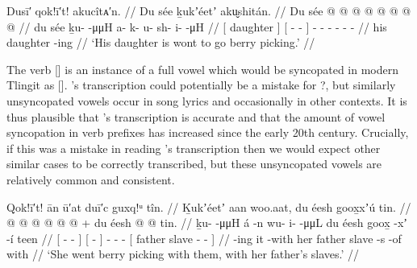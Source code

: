 \ex\label{ex:89-2-daughter-berry-picking}%
%
\begingl
	\glpreamble	Dusī′ qok!ī′t! akucîtᴀ′n. //
	\glpreamble	Du sée ḵukʼéetʼ aku̬shitán. //
	\gla	{} Du sée {}
		{}  @ {} @ {} {} {}
		 @ {} @ {} @ {} @ {} @ {} @ {} //
	\glb	{} du sée {} 
		{} ḵu-  -μμH {} {}
		a- k- u- sh- i-  -μH //
	\glc	{}[  daughter {}]
		{}[ -  - \· {}]
		- - - - -  - //
	\gld	{} his daughter {}
		{}  {} {} -ing {}
		 {} {} {} {} {} {} //
	\glft	‘His daughter is wont to go berry picking.’
		//
\endgl
\xe

The verb  [] is an instance of a full vowel which would be syncopated in modern Tlingit as  [].
\citeauthor{swanton:1909}’s transcription  could potentially be a mistake for ?, but similarly unsyncopated vowels occur in song lyrics and occasionally in other contexts.
It is thus plausible that \citeauthor{swanton:1909}’s transcription is accurate and that the amount of vowel syncopation in verb prefixes has increased since the early 20th century.
Crucially, if this was a mistake in reading \citeauthor{swanton:1909}’s transcription then we would expect other similar cases to be correctly transcribed, but these unsyncopated vowels are relatively common and consistent.

\ex\label{ex:89-3-berry-picking-with-dads-slaves}%
%
\begingl
	\glpreamble	Qok!ī′t! ān ū′at duī′c guxq!ᵘ tîn. //
	\glpreamble	Ḵukʼéetʼ aan woo.aat, du éesh goox̱xʼú tin. //
	\gla	{}  @ {} @ {} {} {}
		{}  @ {} {}
		 @ {} @ {} @ {} +
		{} du éesh  @ {} @ {} tin. {} //
	\glb	{} ḵu-  -μμH {} {}
		{} á -n {}
		wu- i-  -μμL
		{} du éesh goox̱ -xʼ -í teen {} //
	\glc	{}[ -  - \· {}]
		{}[  - {}]
		- -  -
		{}[  father slave - -  {}] //
	\gld	{}  {} {} -ing {}
		{} it -with {}
		 {} {} {}
		{} her father slave -s -of with {} //
	\glft	‘She went berry picking with them, with her father’s slaves.’
		//
\endgl
\xe


